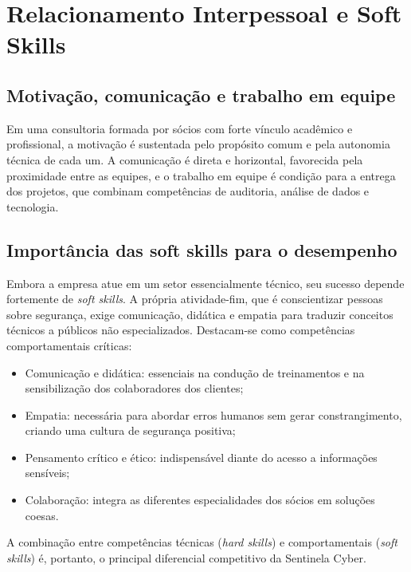 \documentclass[12pt,a4paper]{article}
\begin{document}
\section{Relacionamento Interpessoal e Soft Skills}

\subsection{Motivação, comunicação e trabalho em equipe}

Em uma consultoria formada por sócios com forte vínculo acadêmico e
profissional, a motivação é sustentada pelo propósito comum e pela autonomia
técnica de cada um. A comunicação é direta e horizontal, favorecida pela
proximidade entre as equipes, e o trabalho em equipe é condição para a entrega
dos projetos, que combinam competências de auditoria, análise de dados e
tecnologia.

\subsection{Importância das soft skills para o desempenho}

Embora a empresa atue em um setor essencialmente técnico, seu sucesso depende
fortemente de \textit{soft skills}. A própria atividade-fim, que é conscientizar
pessoas sobre segurança, exige comunicação, didática e empatia para traduzir
conceitos técnicos a públicos não especializados. Destacam-se como competências
comportamentais críticas:

\begin{itemize}[noitemsep]
  \item Comunicação e didática: essenciais na condução de treinamentos e na
        sensibilização dos colaboradores dos clientes;
  \item Empatia: necessária para abordar erros humanos sem gerar
        constrangimento, criando uma cultura de segurança positiva;
  \item Pensamento crítico e ético: indispensável diante do acesso a
        informações sensíveis;
  \item Colaboração: integra as diferentes especialidades dos sócios em
        soluções coesas.
\end{itemize}

A combinação entre competências técnicas (\textit{hard skills}) e
comportamentais (\textit{soft skills}) é, portanto, o principal diferencial
competitivo da Sentinela Cyber.
\end{document}

